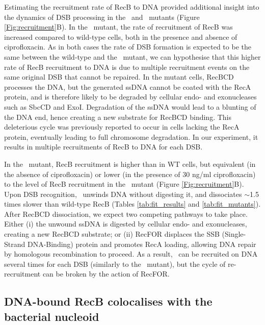 Estimating the recruitment rate of RecB to DNA provided additional insight into the dynamics of DSB processing in the \dreca\ and \geneteneighty\ mutants (Figure \ref{Fig:recruitment}B). In the \dreca\ mutant, the rate of recruitment of RecB was increased compared to wild-type cells, both in the presence and absence of ciprofloxacin. As in both cases the rate of DSB formation is expected to be the same between the wild-type and the \dreca\ mutant, we can hypothesise that this higher rate of RecB recruitment to DNA is due to multiple recruitment events on the same original DSB that cannot be repaired. In the mutant cells, RecBCD processes the DNA, but the generated ssDNA cannot be coated with the RecA protein, and is therefore likely to be degraded by cellular endo- and exonucleases such as SbcCD and ExoI\cite{Zahradka2009}. Degradation of the ssDNA would lead to a blunting of the DNA end, hence creating a new substrate for RecBCD binding. This deleterious cycle was previously reported to occur in cells lacking the RecA protein, eventually leading to full chromosome degradation\cite{Capaldo1975,Skarstad1993}. In our experiment, it results in multiple recruitments of RecB to DNA for each DSB.

In the \geneteneighty\ mutant, RecB recruitment is higher than in WT cells, but equivalent (in the absence of ciprofloxacin) or lower (in the presence of 30 ng/ml ciprofloxacin) to the level of RecB recruitment in the \dreca\ mutant (Figure \ref{Fig:recruitment}B). Upon DSB recognition, \teneighty\ unwinds DNA without digesting it, and dissociates $\sim$1.5 times slower than wild-type RecB (Tables \ref{tab:fit_results} and \ref{tab:fit_mutants}). After RecBCD dissociation, we expect two competing pathways to take place. Either (i) the unwound ssDNA is digested by cellular endo- and exonucleases, creating a new RecBCD substrate; or (ii) RecFOR displaces the SSB (Single-Strand DNA-Binding) protein and promotes RecA loading, allowing DNA repair by homologous recombination to proceed\cite{Ivancic-Bace_2003}. As a result, \teneighty\ can be recruited on DNA several times for each DSB (similarly to the \dreca\ mutant), but the cycle of re-recruitment can be broken by the action of RecFOR.


\subsection*{DNA-bound RecB colocalises with the bacterial nucleoid}

